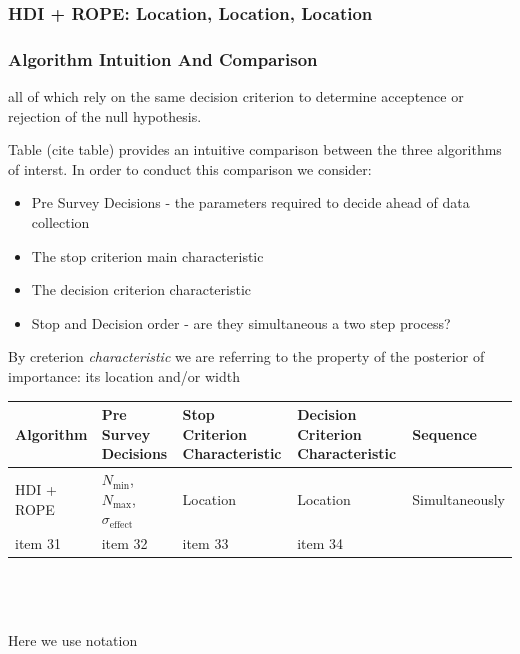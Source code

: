 \documentclass{article}
\begin{document}
\subsubsection{HDI + ROPE: Location, Location, Location}

\subsubsection{Algorithm Intuition And Comparison}

all of which rely on the same decision criterion to determine acceptence
or rejection of the null hypothesis.




Table (cite table) provides an intuitive comparison between the three algorithms of interst.
In order to conduct this comparison we consider:
\begin{itemize}
    \item Pre Survey Decisions - the parameters required to decide ahead of data
    collection
    \item The stop criterion main characteristic 
    \item The decision criterion characteristic
    \item Stop and Decision order - are they simultaneous a two step process?
\end{itemize}
By creterion {\it characteristic} we are referring to the property of the posterior of
importance: its location and/or width


\begin{tabularx}{1.2\textwidth} { 
    | >{\raggedright\arraybackslash}X 
    | >{\centering\arraybackslash}X 
    | >{\raggedright\arraybackslash}X 
    | >{\centering\arraybackslash}X 
    | >{\raggedleft\arraybackslash}X | }
   \hline
   Algorithm & Pre Survey Decisions & Stop Criterion Characteristic

   & Decision Criterion Characteristic & Sequence\\
   \hline
   HDI + ROPE  & \textbf{$N_\mathrm{min}$}, $N_\mathrm{max}$, $\sigma_\mathrm{effect}$  & Location  & Location & Simultaneously \\
   \hline
   item 31  & item 32  & item 33  & item 34 \\
   
  \hline
  \end{tabularx}
\\
\\
\\
Here we use notation
\end{document}
